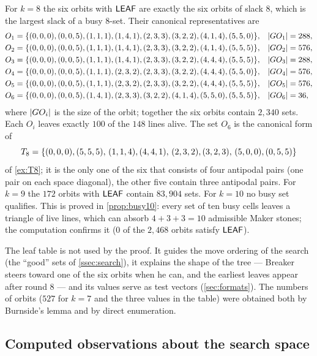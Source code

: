 For $k=8$ the six orbits with $\mathsf{LEAF}$ are exactly the six orbits of slack $8$, which is the largest slack
of a busy $8$-set. Their canonical representatives are
\begin{align*}
O_1&=\{(0,0,0),(0,0,5),(1,1,1),(1,4,1),(2,3,3),(3,2,2),(4,1,4),(5,5,0)\}, & |G O_1|&=288,\\
O_2&=\{(0,0,0),(0,0,5),(1,1,1),(1,4,1),(2,3,3),(3,2,2),(4,1,4),(5,5,5)\}, & |G O_2|&=576,\\
O_3&=\{(0,0,0),(0,0,5),(1,1,1),(1,4,1),(2,3,3),(3,2,2),(4,4,4),(5,5,5)\}, & |G O_3|&=288,\\
O_4&=\{(0,0,0),(0,0,5),(1,1,1),(2,3,2),(2,3,3),(3,2,2),(4,4,4),(5,5,0)\}, & |G O_4|&=576,\\
O_5&=\{(0,0,0),(0,0,5),(1,1,1),(2,3,2),(2,3,3),(3,2,2),(4,4,4),(5,5,5)\}, & |G O_5|&=576,\\
O_6&=\{(0,0,0),(0,0,5),(1,4,1),(2,3,3),(3,2,2),(4,1,4),(5,5,0),(5,5,5)\}, & |G O_6|&=36,
\end{align*}
where $|G O_i|$ is the size of the orbit; together the six orbits contain $2{,}340$ sets. Each $O_i$
leaves exactly $100$ of the $148$ lines alive. The set $O_6$ is the canonical form of
\[
T_8=\{(0,0,0),(5,5,5),\,(1,1,4),(4,4,1),\,(2,3,2),(3,2,3),\,(5,0,0),(0,5,5)\}
\]
of \cref{ex:T8}; it is the only one of the six that consists of four antipodal pairs (one pair on each
space diagonal), the other five contain three antipodal pairs. For $k=9$ the $172$ orbits with $\mathsf{LEAF}$
contain $83{,}904$ sets. For $k=10$ no busy set qualifies. This is proved in \cref{prop:busy10}: every
set of ten busy cells leaves a triangle of live lines, which can absorb $4+3+3=10$ admissible Maker
stones; the computation confirms it ($0$ of the $2{,}468$ orbits satisfy $\mathsf{LEAF}$).

The leaf table is not used by the proof. It guides the move ordering of the search (the ``good'' sets
of \cref{ssec:search}), it explains the shape of the tree --- Breaker steers toward one of the six orbits
when he can, and the earliest leaves appear after round $8$ --- and its values serve as test vectors
(\cref{sec:formats}). The numbers of orbits ($527$ for $k=7$ and the three values in the table) were
obtained both by Burnside's lemma and by direct enumeration.

\subsection{Computed observations about the search space}\label{ssec:observations}

